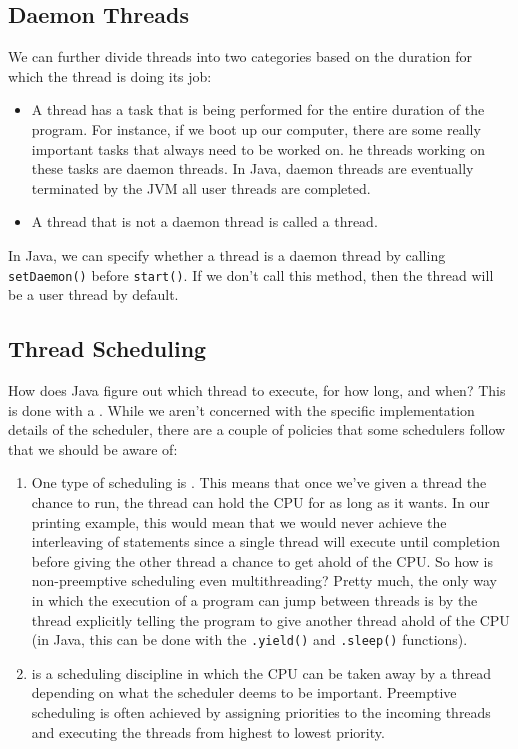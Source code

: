 \subsection{Daemon Threads}

We can further divide threads into two categories based on the duration for which the thread is doing its job:

\begin{itemize}
    \item A  thread has a task that is being performed for the entire duration of the program. For instance, if we boot up our computer, there are some really important tasks that always need to be worked on. he threads working on these tasks are daemon threads. In Java, daemon threads are eventually terminated by the JVM all user threads are completed. 
    \item A thread that is not a daemon thread is called a  thread. 
\end{itemize}

In Java, we can specify whether a thread is a daemon thread by calling \verb!setDaemon()! before \verb!start()!. If we don't call this method, then the thread will be a user thread by default. 

\subsection{Thread Scheduling}

How does Java figure out which thread to execute, for how long, and when? This is done with a . While we aren't concerned with the specific implementation details of the scheduler, there are a couple of policies that some schedulers follow that we should be aware of:

\begin{enumerate}
    \item One type of scheduling is . This means that once we've given a thread the chance to run, the thread can hold the CPU for as long as it wants. In our printing example, this would mean that we would never achieve the interleaving of statements since a single thread will execute until completion before giving the other thread a chance to get ahold of the CPU. So how is non-preemptive scheduling even multithreading? Pretty much, the only way in which the execution of a program can jump between threads is by the thread explicitly telling the program to give another thread ahold of the CPU (in Java, this can be done with the \verb!.yield()! and \verb!.sleep()! functions).
    \item {} is a scheduling discipline in which the CPU can be taken away by a thread depending on what the scheduler deems to be important. Preemptive scheduling is often achieved by assigning priorities to the incoming threads and executing the threads from highest to lowest priority.
\end{enumerate}

